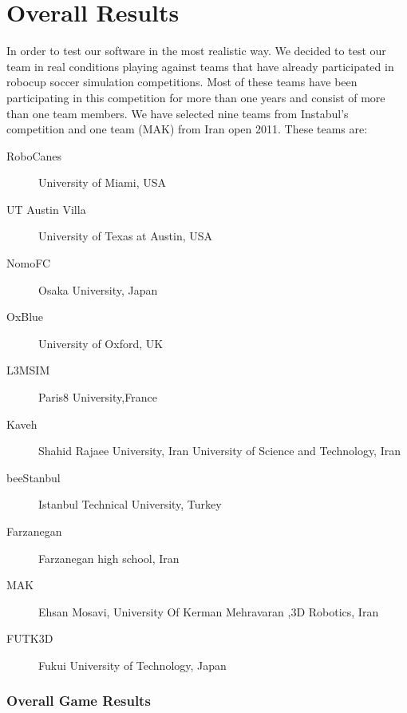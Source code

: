 \section{Overall Results}
In order to test our software in the most realistic way. We decided to test our team in real conditions playing against teams that have already participated in robocup soccer simulation competitions. Most of these teams have been participating in this competition for more than one years and consist of more than one team members. We have selected nine teams from Instabul's competition and one team (MAK) from Iran open 2011. These teams are:
\begin{description}
\item[RoboCanes]	University of Miami, USA 
\item[UT Austin Villa]	University of Texas at Austin, USA
\item[NomoFC]	Osaka University, Japan
\item[OxBlue]	University of Oxford, UK
\item[L3MSIM]	Paris8 University,France
\item[Kaveh] 	Shahid Rajaee University, Iran University of Science and Technology, Iran
\item[beeStanbul]	Istanbul Technical University, Turkey
\item[Farzanegan]	Farzanegan high school, Iran
\item[MAK]	Ehsan Mosavi, University Of Kerman Mehravaran ,3D Robotics, Iran
\item[FUTK3D]	Fukui University of Technology, Japan
\end{description}

\subsubsection*{Overall Game Results}

